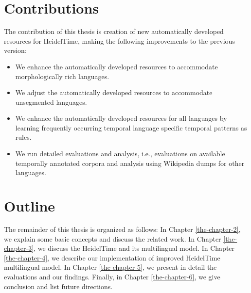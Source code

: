 \section{Contributions}
The contribution of this thesis is creation of new automatically developed resources for HeidelTime, making the following improvements to the previous version:
\begin{itemize}
	\item We enhance the automatically developed resources to accommodate morphologically rich languages.
	\item We adjust the automatically developed resources to accommodate unsegmented languages.
	\item We enhance the automatically developed resources for all languages by learning frequently occurring temporal language specific temporal patterns as rules.
	\item We run detailed evaluations and analysis, i.e., evaluations on available temporally annotated corpora and analysis using Wikipedia dumps for other languages.
\end{itemize}
\section{Outline}
The remainder of this thesis is organized as follows: In Chapter \ref{the-chapter-2}, we explain some basic concepts and discuss the related work. In Chapter \ref{the-chapter-3}, we discuss the HeidelTime and its multilingual model. In Chapter \ref{the-chapter-4}, we describe our implementation of improved HeidelTime multilingual  model. In Chapter \ref{the-chapter-5}, we present in detail the evaluations and our findings. Finally, in Chapter \ref{the-chapter-6}, we give conclusion and list future directions.